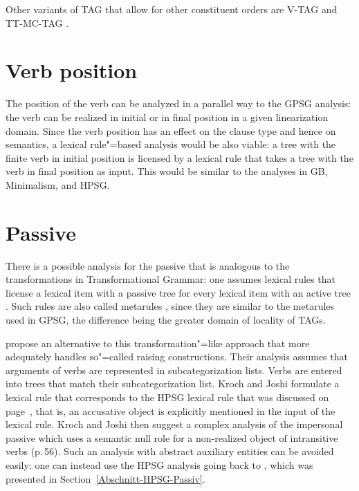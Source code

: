 Other variants of TAG that allow for other constituent orders are V-TAG \citep{Rambow94a} 
and TT-MC-TAG \citep{Lichte2007a}.

\section{Verb position}

\largerpage
The position of the verb can be analyzed in a parallel way to the GPSG analysis:
the verb can be realized in initial or in final position in a given linearization domain. Since the
verb position has an effect on the clause type and hence on semantics, a lexical rule"=based
analysis would be also viable: a tree with the finite verb in initial position is licensed by a
lexical rule that takes a tree with the verb in final position as input. This would be similar to
the analyses in GB, Minimalism, and HPSG.

\section{Passive}

There is a possible analysis for the passive that is analogous to the transformations in Transformational Grammar: one assumes lexical rules that
license a lexical item with a passive tree for every lexical item with an active tree
\parencites[--51]{KJ85a}[]{Becker94a-u}[80--81]{EGW95a}. Such rules are also called metarules
\parencites[Section~6.1]{Becker94a-u}[596]{CDGRP2013a-u}, since they are similar to the metarules
used in GPSG, the difference being the greater domain of locality of TAGs.

\citet[]{KJ85a} propose an alternative to this transformation"=like approach that more adequately handles so"=called raising constructions.
Their analysis assumes that arguments of verbs are represented in subcategorization lists. Verbs are entered into trees that match their subcategorization
list. Kroch and Joshi formulate a lexical rule that corresponds to the HPSG lexical rule that was discussed on page~\pageref{pass-lr-mlr}, that is,
an accusative object is explicitly mentioned in the input of the lexical rule. Kroch and Joshi then suggest a complex analysis of the impersonal passive which
uses a semantic null role for a non-realized object of intransitive verbs (p.\,56). Such an analysis
with abstract auxiliary entities can be avoided easily: one can instead use the HPSG\indexhpsg
analysis going back to \citet{Haider86}, which was presented in Section~\ref{Abschnitt-HPSG-Passiv}.

